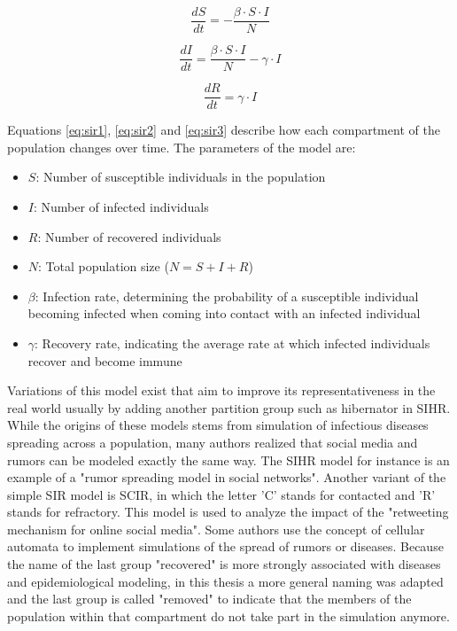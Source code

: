 \begin{equation} \label{eq:sir1}
    \frac{{dS}}{{dt}} = -\frac{{\beta \cdot S \cdot I}}{{N}}
\end{equation}

\begin{equation} \label{eq:sir2}
    \frac{{dI}}{{dt}} = \frac{{\beta \cdot S \cdot I}}{{N}} - \gamma \cdot I
\end{equation}

\begin{equation} \label{eq:sir3}
    \frac{{dR}}{{dt}} = \gamma \cdot I
\end{equation}

Equations \ref{eq:sir1}, \ref{eq:sir2} and \ref{eq:sir3} describe how each compartment of the population changes over time.
The parameters of the model are:

\begin{itemize}
    \item $S$: Number of susceptible individuals in the population
    \item $I$: Number of infected individuals
    \item $R$: Number of recovered individuals
    \item $N$: Total population size ($N = S + I + R$)
    \item $\beta$: Infection rate, determining the probability of a susceptible individual becoming infected when coming into contact with an infected individual
    \item $\gamma$: Recovery rate, indicating the average rate at which infected individuals recover and become immune
\end{itemize}

Variations of this model exist that aim to improve its representativeness in the real world usually by adding another partition group such as hibernator in SIHR\cite{zhao2012sihr}.
While the origins of these models stems from simulation of infectious diseases spreading across a population, many authors realized that social media and rumors can be modeled exactly the same way.
The SIHR model for instance is an example of a "rumor spreading model in social networks"\cite{zhao2012sihr}.
Another variant of the simple SIR model is SCIR, in which the letter 'C' stands for contacted and 'R' stands for refractory.
This model is used to analyze the impact of the "retweeting mechanism for online social media"\cite{xiong2012scir}.
Some authors use the concept of cellular automata to implement simulations of the spread of rumors or diseases\cite{silva2020}.
Because the name of the last group "recovered" is more strongly associated with diseases and epidemiological modeling, in this thesis a more general naming was adapted and the last group is called "removed" to indicate that the members of the population within that compartment do not take part in the simulation anymore.

